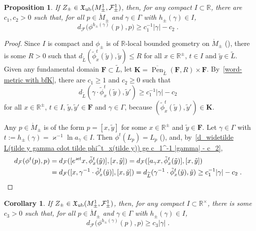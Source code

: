 \documentclass{memo-l}
\theoremstyle{plain}
\newtheorem{cor}[thm]{Corollary}
\newtheorem{prop}[thm]{Proposition}
\theoremstyle{definition}
\theoremstyle{remark}
\newcommand{\R}{\mathbb{R}}
\newcommand{\FF}{\mathcal{F}}
\newcommand{\fX}{\mathfrak{X}}
\newcommand{\bfF}{\boldsymbol{F}}
\newcommand{\bfK}{\boldsymbol{K}}
\newcommand{\Pen}{\operatorname{Pen}}
\newcommand{\fXub}{\fX_{\text{\rm ub}}}
\numberwithin{section}{chapter}
\numberwithin{equation}{section}%
\begin{document}
\begin{prop}\label{p: d_FF(phi^t(p) p) ge c_1^{-1} |gamma| - c_2}
If $Z_\pm\in\fXub(M^1_\pm,\FF^1_\pm)$, then, for any compact $I\subset\R$, there are $c_1,c_2>0$ such that, for all $p\in\mathring M_\pm$ and $\gamma\in\Gamma$ with $h_\pm(\gamma)\in I$,
\[
d_{\FF}\big(\phi^{h_\pm(\gamma)}(p),p\big)\ge c_1^{-1}|\gamma|-c_2\;.
\]
\end{prop}

\begin{proof}
Since $I$ is compact and $\phi_\pm$ is of $\R$-local bounded geometry on $\mathring M_\pm$ (), there is some $R>0$ such that $d_{\widetilde L}(\tilde\phi^t_x(\tilde y),\tilde y)\le R$ for all $x\in\R^\pm$, $t\in I$ and $\tilde y \in\widetilde L$. Given any fundamental domain $\bfF\subset\widetilde L$, let $\bfK=\overline{\Pen}_{\widetilde L}(\bfF,R)\times\bfF$. By~\eqref{word-metric with bfK}, there are $c_1\ge1$ and $c_2\ge0$ such that 
\begin{equation}\label{d_widetilde L(tilde y gamma cdot tilde phi^t_x(tilde y)) ge c_1^-1 |gamma| - c_2}
d_{\widetilde L}(\gamma\cdot\tilde\phi^t_x(\tilde y),\tilde y')\ge c_1^{-1}|\gamma|-c_2
\end{equation}
for all $x\in\R^\pm$, $t\in I$, $\tilde y,\tilde y'\in\bfF$ and $\gamma\in\Gamma$, because $(\tilde\phi^t_x(\tilde y),\tilde y')\in\bfK$.

Any $p\in\mathring M_\pm$ is of the form $p=[x,\tilde y]$ for some $x\in\R^\pm$ and $\tilde y\in\bfF$. Let $\gamma\in\Gamma$ with $t:=h_\pm(\gamma)=\varkappa^{-1}\ln a_\gamma\in I$. Then $\phi^t(L_p)=L_p$ (), and, by~\eqref{d_widetilde L(tilde y gamma cdot tilde phi^t_x(tilde y)) ge c_1^-1 |gamma| - c_2},
\begin{align*}
d_\FF(\phi^t(p),p)&=d_\FF([e^{\varkappa t}x,\tilde\phi^t_x(\tilde y)],[x,\tilde y])
=d_\FF([a_\gamma x,\tilde\phi^t_x(\tilde y)],[x,\tilde y])\\
&=d_\FF([x,\gamma^{-1}\cdot\tilde\phi^t_x(\tilde y)],[x,\tilde y])
=d_{\widetilde L}(\gamma^{-1}\cdot\tilde\phi^t_x(\tilde y),\tilde y)
\ge c_1^{-1}|\gamma|-c_2\;.\qedhere
\end{align*}
\end{proof}

\begin{cor}\label{c: d_FF(phi^t(p) p) ge c_3 |gamma|}
If $Z_\pm\in\fXub(M^1_\pm,\FF^1_\pm)$, then, for any compact $I\subset\R^\times$, there is some $c_3>0$ such that, for all $p\in\mathring M_\pm$ and $\gamma\in\Gamma$ with $h_\pm(\gamma)\in I$,
\[
d_{\FF}\big(\phi^{h_\pm(\gamma)}(p),p\big)\ge c_3|\gamma|\;.
\] 
\end{cor}
\end{document}
